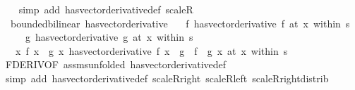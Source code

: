 \begin{isabellebody}
\ \ \isamarkupfalse%
\ {\isacharparenleft}{\kern0pt}simp\ add{\isacharcolon}{\kern0pt}\ has{\isacharunderscore}{\kern0pt}vector{\isacharunderscore}{\kern0pt}derivative{\isacharunderscore}{\kern0pt}def\ scaleR{\isacharparenright}{\kern0pt}%
\endisatagproof
{\isafoldproof}%
%
\isadelimproof
\isanewline
%
\endisadelimproof
\isanewline
{}\isamarkupfalse%
\ {\isacharparenleft}{\kern0pt}\ bounded{\isacharunderscore}{\kern0pt}bilinear{\isacharparenright}{\kern0pt}\ has{\isacharunderscore}{\kern0pt}vector{\isacharunderscore}{\kern0pt}derivative{\isacharcolon}{\kern0pt}\isanewline
\ \ \ {\isachardoublequoteopen}{\isacharparenleft}{\kern0pt}f\ has{\isacharunderscore}{\kern0pt}vector{\isacharunderscore}{\kern0pt}derivative\ f{\isacharprime}{\kern0pt}{\isacharparenright}{\kern0pt}\ {\isacharparenleft}{\kern0pt}at\ x\ within\ s{\isacharparenright}{\kern0pt}{\isachardoublequoteclose}\isanewline
\ \ \ \ \ {\isachardoublequoteopen}{\isacharparenleft}{\kern0pt}g\ has{\isacharunderscore}{\kern0pt}vector{\isacharunderscore}{\kern0pt}derivative\ g{\isacharprime}{\kern0pt}{\isacharparenright}{\kern0pt}\ {\isacharparenleft}{\kern0pt}at\ x\ within\ s{\isacharparenright}{\kern0pt}{\isachardoublequoteclose}\isanewline
\ \ \ {\isachardoublequoteopen}{\isacharparenleft}{\kern0pt}{\isacharparenleft}{\kern0pt}{\isasymlambda}x{\isachardot}{\kern0pt}\ f\ x\ {\isacharasterisk}{\kern0pt}{\isacharasterisk}{\kern0pt}\ g\ x{\isacharparenright}{\kern0pt}\ has{\isacharunderscore}{\kern0pt}vector{\isacharunderscore}{\kern0pt}derivative\ {\isacharparenleft}{\kern0pt}f\ x\ {\isacharasterisk}{\kern0pt}{\isacharasterisk}{\kern0pt}\ g{\isacharprime}{\kern0pt}\ {\isacharplus}{\kern0pt}\ f{\isacharprime}{\kern0pt}\ {\isacharasterisk}{\kern0pt}{\isacharasterisk}{\kern0pt}\ g\ x{\isacharparenright}{\kern0pt}{\isacharparenright}{\kern0pt}\ {\isacharparenleft}{\kern0pt}at\ x\ within\ s{\isacharparenright}{\kern0pt}{\isachardoublequoteclose}\isanewline
%
\isadelimproof
\ \ %
\endisadelimproof
%
\isatagproof
{}\isamarkupfalse%
\ FDERIV{\isacharbrackleft}{\kern0pt}OF\ assms{\isacharparenleft}{\kern0pt}{}{\isacharminus}{\kern0pt}{}{\isacharparenright}{\kern0pt}{\isacharbrackleft}{\kern0pt}unfolded\ has{\isacharunderscore}{\kern0pt}vector{\isacharunderscore}{\kern0pt}derivative{\isacharunderscore}{\kern0pt}def{\isacharbrackright}{\kern0pt}{\isacharbrackright}{\kern0pt}\isanewline
\ \ \isamarkupfalse%
\ {\isacharparenleft}{\kern0pt}simp\ add{\isacharcolon}{\kern0pt}\ has{\isacharunderscore}{\kern0pt}vector{\isacharunderscore}{\kern0pt}derivative{\isacharunderscore}{\kern0pt}def\ scaleR{\isacharunderscore}{\kern0pt}right\ scaleR{\isacharunderscore}{\kern0pt}left\ scaleR{\isacharunderscore}{\kern0pt}right{\isacharunderscore}{\kern0pt}distrib{\isacharparenright}{\kern0pt}%

\end{isabellebody}
